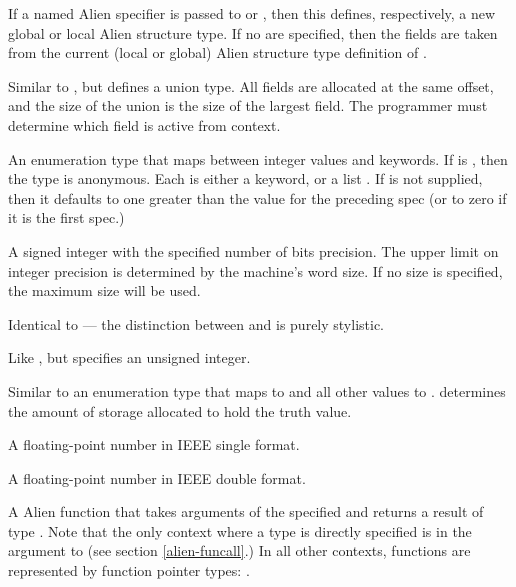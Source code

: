 {If a named Alien  specifier is passed to 
or , then this defines, respectively, a new global or local
Alien structure type.  If no  are specified, then the fields are
taken from the current (local or global) Alien structure type definition of
.
\enddeftp

Similar to , but defines a union type.  All fields are allocated at
the same offset, and the size of the union is the size of the largest field.
The programmer must determine which field is active from context.
\enddeftp

An enumeration type that maps between integer values and keywords.  If
 is \false, then the type is anonymous.  Each  is either
a keyword, or a list .  If  is
not supplied, then it defaults to one greater than the value for the preceding
spec (or to zero if it is the first spec.)
\enddeftp

A signed integer with the specified number of bits precision.  The upper limit
on integer precision is determined by the machine's word size.  If no size is
specified, the maximum size will be used.
\enddeftp

Identical to  --- the distinction between  and
 is purely stylistic.
\enddeftp

Like , but specifies an unsigned integer.
\enddeftp

Similar to an enumeration type that maps  to \false{} and all other values
to \true.   determines the amount of storage allocated to hold the
truth value.
\enddeftp

A floating-point number in IEEE single format.
\enddeftp

A floating-point number in IEEE double format.
\enddeftp

\label{alien-function-types}
A Alien function that takes arguments of the specified  and
returns a result of type .  Note that the only context where
a  type is directly specified is in the argument to
 (see section \ref{alien-funcall}.)  In all other contexts,
functions are represented by function pointer types: .  \enddeftp

}
